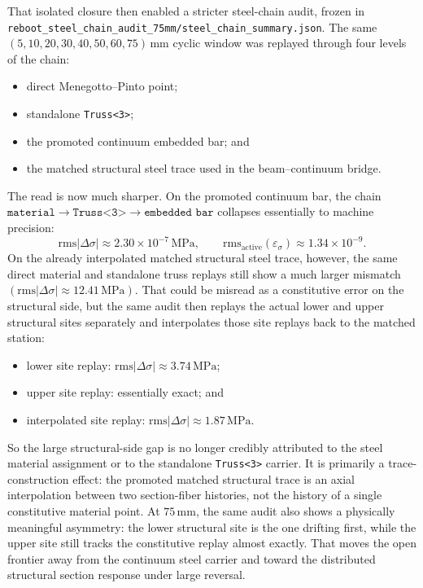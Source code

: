 That isolated closure then enabled a stricter steel-chain audit, frozen in
\texttt{reboot\_steel\_chain\_audit\_75mm/steel\_chain\_summary.json}. The same
\((5,10,20,30,40,50,60,75)\,\mathrm{mm}\) cyclic window was replayed through four
levels of the chain:
\begin{itemize}
  \item direct Menegotto--Pinto point;
  \item standalone \texttt{Truss<3>};
  \item the promoted continuum embedded bar; and
  \item the matched structural steel trace used in the beam--continuum bridge.
\end{itemize}

The read is now much sharper. On the promoted continuum bar, the chain
\(\texttt{material} \rightarrow \texttt{Truss<3>} \rightarrow
\texttt{embedded bar}\) collapses essentially to machine precision:
\[
\mathrm{rms}|\Delta \sigma| \approx 2.30\times10^{-7}\,\mathrm{MPa},\qquad
\mathrm{rms}_{\text{active}}(\varepsilon_\sigma) \approx 1.34\times10^{-9}.
\]
On the already interpolated matched structural steel trace, however, the same
direct material and standalone truss replays still show a much larger mismatch
\((\mathrm{rms}|\Delta \sigma| \approx 12.41\,\mathrm{MPa})\). That could be
misread as a constitutive error on the structural side, but the same audit
then replays the actual lower and upper structural sites separately and
interpolates those site replays back to the matched station:
\begin{itemize}
  \item lower site replay:
    \(\mathrm{rms}|\Delta \sigma| \approx 3.74\,\mathrm{MPa}\);
  \item upper site replay: essentially exact; and
  \item interpolated site replay:
    \(\mathrm{rms}|\Delta \sigma| \approx 1.87\,\mathrm{MPa}\).
\end{itemize}
So the large structural-side gap is no longer credibly attributed to the steel
material assignment or to the standalone \texttt{Truss<3>} carrier. It is
primarily a trace-construction effect: the promoted matched structural trace is
an axial interpolation between two section-fiber histories, not the history of
a single constitutive material point. At \(75\,\mathrm{mm}\), the same audit
also shows a physically meaningful asymmetry: the lower structural site is the
one drifting first, while the upper site still tracks the constitutive replay
almost exactly. That moves the open frontier away from the continuum steel
carrier and toward the distributed structural section response under large
reversal.


